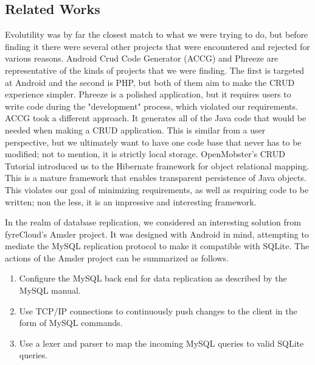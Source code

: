 \subsection{Related Works} \label{sec:related}

Evolutility\cite{giulieri_evolutility_????} was by far the closest match to what
we were trying to do, but before finding it there were several other projects
that were encountered and rejected for various reasons. Android Crud Code
Generator (ACCG)\cite{popovski_android-crud-code-generator_????} and
Phreeze\cite{hinkle_phreeze_????} are representative of the kinds of projects
that we were finding. The first is targeted at Android and the second is PHP,
but both of them aim to make the CRUD experience simpler. Phreeze is a polished
application, but it requires users to write code during the "development"
process, which violated our requirements. ACCG took a different approach. It
generates all of the Java code that would be needed when making a CRUD
application. This is similar from a user perspective, but we ultimately want to
have one code base that never has to be modified; not to mention, it is strictly
local storage. OpenMobster's CRUD
Tutorial\cite{openmobster_mobilizehibernate_????} introduced us to the Hibernate
framework\cite{jboss_community_hibernate_????} for object relational mapping.
This is a mature framework that enables transparent persistence of Java objects.
This violates our goal of minimizing requirements, as well as requiring code to
be written; non the less, it is an impressive and interesting framework. 


In the realm of database replication, we considered an interesting solution from
fyreCloud's Amsler project. It was designed with Android in mind, attempting to
mediate the MySQL replication protocol to make it compatible with
SQLite\cite{fyrecloud_solutions_fyrecloud_????}. The actions of the Amsler
project can be summarized as follows.

\begin{enumerate}
\item Configure the MySQL back end for data replication as described by the MySQL manual. 
\item Use TCP/IP connections to continuously push changes to the client in the form of MySQL commands.
\item Use a lexer and parser to map the incoming MySQL queries to valid SQLite queries. 
\end{enumerate}


